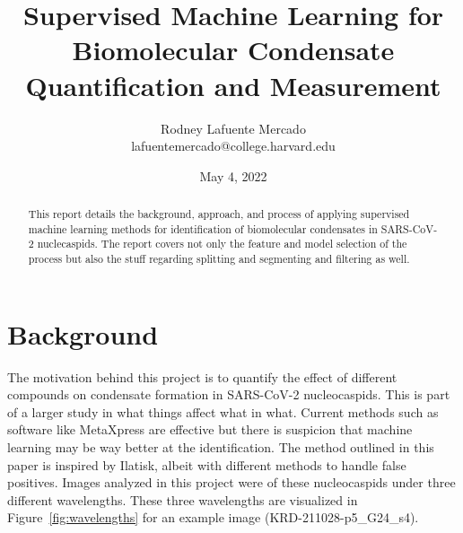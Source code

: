 \documentclass[11pt]{article}
\title{Supervised Machine Learning for Biomolecular Condensate Quantification and Measurement}
\author{Rodney Lafuente Mercado \\ lafuentemercado@college.harvard.edu}
\date{May 4, 2022}
\begin{document}
\maketitle{}

\begin{abstract}
\noindent This report details the background, approach, and process of applying supervised machine
learning methods for identification of biomolecular condensates in SARS-CoV-2 nuclecaspids. The
report covers not only the feature and model selection of the process but also the stuff regarding
splitting and segmenting and filtering as well.
\end{abstract}

\section{Background}

The motivation behind this project is to quantify the effect of different compounds on condensate
formation in SARS-CoV-2 nucleocaspids. This is part of a larger study in what things affect what in
what. Current methods such as software like MetaXpress are effective but there is suspicion that
machine learning may be way better at the identification. The method outlined in this paper is
inspired by Ilatisk, albeit with different methods to handle false positives. Images analyzed in
this project were of these nucleocaspids under three different wavelengths. These three wavelengths
are visualized in Figure~\ref{fig:wavelengths} for an example image (KRD-211028-p5\_G24\_s4).
\end{document}

